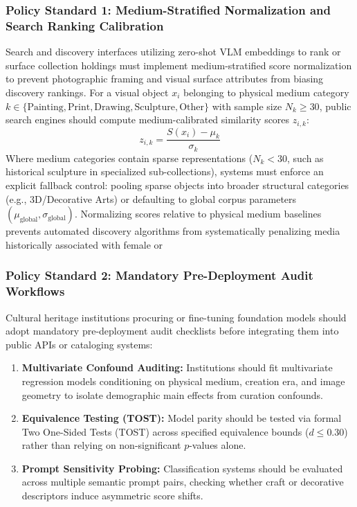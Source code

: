 \documentclass[pdflatex,sn-mathphys-num]{sn-jnl}%
\theoremstyle{thmstyleone}%
\theoremstyle{thmstyletwo}%
\theoremstyle{thmstylethree}%
\begin{document}
\subsubsection{Policy Standard 1: Medium-Stratified Normalization and Search Ranking Calibration}
Search and discovery interfaces utilizing zero-shot VLM embeddings to rank or surface collection holdings must implement medium-stratified score normalization to prevent photographic framing and visual surface attributes from biasing discovery rankings. For a visual object $x_i$ belonging to physical medium category $k \in \{\text{Painting}, \text{Print}, \text{Drawing}, \text{Sculpture}, \text{Other}\}$ with sample size $N_k \ge 30$, public search engines should compute medium-calibrated similarity scores $z_{i,k}$:
\begin{equation}
z_{i,k} = \frac{S(x_i) - \mu_k}{\sigma_k}
\end{equation}
Where medium categories contain sparse representations ($N_k < 30$, such as historical sculpture in specialized sub-collections), systems must enforce an explicit fallback control: pooling sparse objects into broader structural categories (e.g., 3D/Decorative Arts) or defaulting to global corpus parameters $(\mu_{\text{global}}, \sigma_{\text{global}})$. Normalizing scores relative to physical medium baselines prevents automated discovery algorithms from systematically penalizing media historically associated with female or\subsubsection{Policy Standard 2: Mandatory Pre-Deployment Audit Workflows}
Cultural heritage institutions procuring or fine-tuning foundation models should adopt mandatory pre-deployment audit checklists before integrating them into public APIs or cataloging systems:
\begin{enumerate}
    \item \textbf{Multivariate Confound Auditing:} Institutions should fit multivariate regression models conditioning on physical medium, creation era, and image geometry to isolate demographic main effects from curation confounds.
    \item \textbf{Equivalence Testing (TOST):} Model parity should be tested via formal Two One-Sided Tests (TOST) across specified equivalence bounds ($d \le 0.30$) rather than relying on non-significant $p$-values alone.
    \item \textbf{Prompt Sensitivity Probing:} Classification systems should be evaluated across multiple semantic prompt pairs, checking whether craft or decorative descriptors induce asymmetric score shifts.
\end{enumerate}
\end{document}
